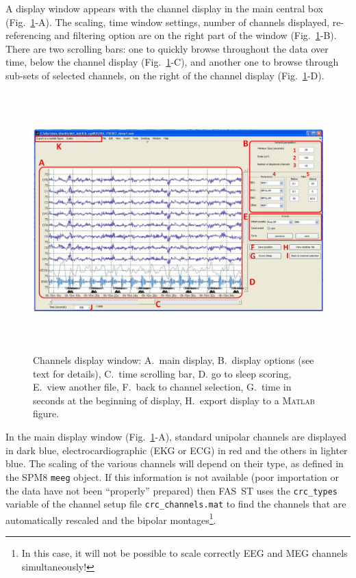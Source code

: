 \documentclass[a4paper,titlepage]{article}
\def\dblS{\hbox{S\hskip -4.5pt S}}
\newcommand{\matlab}{\textsc{Matlab }}
\newcommand{\fasst}{FA\dblS T } 	%
\begin{document}
A display window appears with the channel display in the main central box (Fig.~\ref{fig:TB_dismain}-A). The scaling, time window settings, number of channels displayed, re-referencing and filtering option are on the right part of the window (Fig.~\ref{fig:TB_dismain}-B). There are two scrolling bars: one to quickly browse throughout the data over time, below the channel display (Fig.~\ref{fig:TB_dismain}-C), and another one to browse through sub-sets of selected channels, on the right of the channel display (Fig.~\ref{fig:TB_dismain}-D).
\begin{figure}[ht]
	\centering
		\includegraphics[width=15cm,height=10cm]{images/FIG3_crc_dis.jpg}
	\caption{Channels display window: A.~main display, B.~display options (see text for details), C.~time scrolling bar, D. go to sleep scoring, E.~view another file, F.~back to channel selection, G.~time in seconds at the beginning of display, H.~export display to a \matlab figure.
	\label{fig:TB_dismain}}
\end{figure}

In the main display window (Fig.~\ref{fig:TB_dismain}-A), standard unipolar channels are displayed in dark blue, electrocardiographic (EKG or ECG) in red and the others in lighter blue. The scaling of the various channels will depend on their type, as defined in the SPM8 {\tt meeg} object. If this information is not available (poor importation or the data have not been ``properly'' prepared) then \fasst uses the {\tt crc\_types} variable of the channel setup file {\tt crc\_channels.mat} to find the channels that are automatically rescaled and the bipolar montages\footnote{In this case, it will not be possible to scale correctly EEG and MEG channels simultaneously!}.
\end{document}
